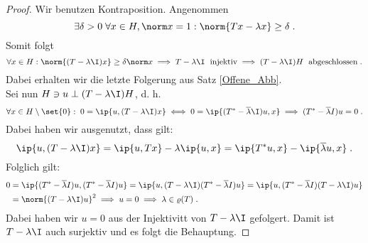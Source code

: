 	\begin{proof}
		Wir benutzen Kontraposition. Angenommen
		\[\exists \delta > 0 \;\forall x \in H, \norm x = 1: \norm{Tx - \lambda x } \geq \delta\;.\]
		Somit folgt
		\[\forall x \in H: \norm{(T-\lambda \I)x} \geq \delta \norm x \implies  T -\lambda \I \;\text{ injektiv} \implies (T-\lambda\I)H \;\text{ abgeschlossen}\;.\]
		Dabei erhalten wir die letzte Folgerung aus Satz \ref{Offene_Abb}.\\
		Sei nun \(H \ni u \perp (T-\lambda\I)H\), d. h. 
		\[\forall x\in H\setminus\set{0}:\; 0 = \ip{u, (T-\lambda\I)x} \iff 0  = \ip{(T^* - \overline\lambda \I)u,x}  \implies  (T^* -\overline \lambda I) u = 0\;.\]
		Dabei haben wir ausgenutzt, dass gilt:
		\[ \ip{u, (T-\lambda\I)x}  = \ip{u,Tx} - \lambda \ip{u,x} = \ip{T^* u, x} - \ip{\overline\lambda u,x}\;. \]
		Folglich gilt:
		\begin{align*}0 &= \ip{(T^* -\overline \lambda I) u,(T^* -\overline \lambda I) u} = \ip{u, (T-\lambda\I)(T^* -\overline \lambda I) u} = \ip{u, (T^* -\overline \lambda I)(T-\lambda\I) u} \\
		&= \norm{(T-\lambda\I)u}^2 \implies u=0 \implies \lambda \in \varrho(T)\;.
		\end{align*}
		Dabei haben wir \(u=0\) aus der Injektivit\as t von \(T-\lambda\I\) gefolgert. Damit ist \(T-\lambda\I\) auch surjektiv und es folgt die Behauptung.
	\end{proof}
	
